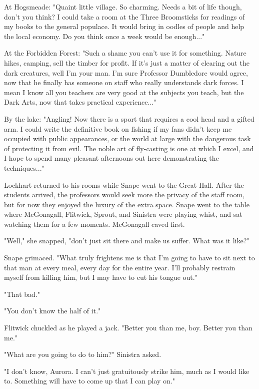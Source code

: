 \documentclass[a4paper,11pt]{article}
\begin{document}
At Hogsmeade: "Quaint little village. So charming. Needs a bit of life though, don't you think? I could take a room at the Three Broomsticks for readings of my books to the general populace. It would bring in oodles of people and help the local economy. Do you think once a week would be enough..."

At the Forbidden Forest: "Such a shame you can't use it for something. Nature hikes, camping, sell the timber for profit. If it's just a matter of clearing out the dark creatures, well I'm your man. I'm sure Professor Dumbledore would agree, now that he finally has someone on staff who really understands dark forces. I mean I know all you teachers are very good at the subjects you teach, but the Dark Arts, now that takes practical experience..."

By the lake: "Angling! Now there is a sport that requires a cool head and a gifted arm. I could write the definitive book on fishing if my fans didn't keep me occupied with public appearances, or the world at large with the dangerous task of protecting it from evil. The noble art of fly-casting is one at which I excel, and I hope to spend many pleasant afternoons out here demonstrating the techniques..."

Lockhart returned to his rooms while Snape went to the Great Hall. After the students arrived, the professors would seek more the privacy of the staff room, but for now they enjoyed the luxury of the extra space. Snape went to the table where McGonagall, Flitwick, Sprout, and Sinistra were playing whist, and sat watching them for a few moments. McGonagall caved first.

"Well," she snapped, "don't just sit there and make us suffer. What was it like?"

Snape grimaced. "What truly frightens me is that I'm going to have to sit next to that man at every meal, every day for the entire year. I'll probably restrain myself from killing him, but I may have to cut his tongue out."

"That bad."

"You don't know the half of it."

Flitwick chuckled as he played a jack. "Better you than me, boy. Better you than me."

"What are you going to do to him?" Sinistra asked.

"I don't know, Aurora. I can't just gratuitously strike him, much as I would like to. Something will have to come up that I can play on."
\end{document}
